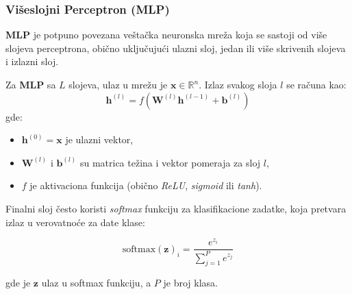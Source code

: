 \documentclass[12pt]{article}
\begin{document}
   \newpage
   \subsubsection*{Višeslojni Perceptron (MLP)}
   \textbf{MLP} je potpuno povezana veštačka neuronska mreža koja se sastoji od više 
   slojeva perceptrona, obično uključujući ulazni sloj, jedan ili više skrivenih slojeva i 
   izlazni sloj.

   Za \textbf{MLP} sa \(L\) slojeva, ulaz u mrežu je \(\mathbf{x} \in \mathbb{R}^n\). 
   Izlaz svakog sloja \(l\) se računa kao:
   \[
   \mathbf{h}^{(l)} = f(\mathbf{W}^{(l)} \mathbf{h}^{(l-1)} + \mathbf{b}^{(l)})
   \]
   gde:
   \vspace{-0.5cm}
   \begin{itemize}
      \item \(\mathbf{h}^{(0)} = \mathbf{x}\) je ulazni vektor,
      \item\(\mathbf{W}^{(l)}\) i \(\mathbf{b}^{(l)}\) su matrica težina i vektor pomeraja za sloj \(l\),
      \item \(f\) je aktivaciona funkcija (obično \textit{ReLU}, \textit{sigmoid} ili \textit{tanh}).
   \end{itemize}

   Finalni sloj često koristi \textit{softmax} funkciju za klasifikacione zadatke, koja pretvara 
   izlaz u verovatnoće za date klase:

   \[
   \text{softmax}(\mathbf{z})_i = \frac{e^{z_i}}{\sum_{j=1}^P e^{z_j}}
   \]

   gde je \(\mathbf{z}\) ulaz u softmax funkciju, a \(P\) je broj klasa.
   \vspace{0.5cm}
\end{document}

